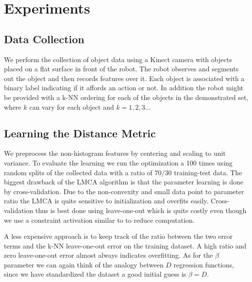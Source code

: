 \section{Experiments}\label{experiments}

\subsection{Data Collection}\label{data-collection}

We perform the collection of object data using a Kinect camera with
objects placed on a flat surface in front of the robot. The robot
observes and segments out the object and then records features over it.
Each object is associated with a binary label indicating if it affords
an action or not. In addition the robot might be provided with a k-NN
ordering for each of the objects in the demonstrated set, where \(k\)
can vary for each object and \(k=1,2,3..\).

\subsection{Learning the Distance
Metric}\label{learning-the-distance-metric}

We preprocess the non-histogram features by centering and scaling to
unit variance. To evaluate the learning we run the optimization a 100
times using random splits of the collected data with a ratio of
\(70/30\) training-test data. The biggest drawback of the LMCA algorithm
is that the parameter learning is done by cross-validation. Due to the
non-convexity and small data point to parameter ratio the LMCA is quite
sensitive to initialization and overfits easily. Cross-validation thus
is best done using leave-one-out which is quite costly even though we
use a constraint activation similar to \cite{Weinberger:2009to} to
reduce computation.

A less expensive approach is to keep track of the ratio between the two
error terms and the k-NN leave-one-out error on the training dataset. A
high ratio and zero leave-one-out error almost always indicates
overfitting. As for the \(\beta\) parameter we can again think of the
analogy between \(D\) regression functions, since we have standardized
the dataset a good initial guess is \(\beta=D\).
